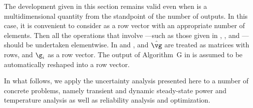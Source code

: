 \begin{remark} 
The development given in this section remains valid even when \g is a
multidimensional quantity from the standpoint of the number of outputs. In this
case, it is convenient to consider \g as a row vector with an appropriate number
of elements. Then all the operations that involve \g---such as those given in
, , and
---should be undertaken elementwise. In
 and , \vg and $\hat{\vg}$ are
treated as matrices with \nc rows, and $\g_i$ as a row vector. The output of
Algorithm~G in  is assumed to be automatically reshaped
into a row vector.
\end{remark}

In what follows, we apply the uncertainty analysis presented here to a number of
concrete problems, namely transient and dynamic steady-state power and
temperature analysis as well as reliability analysis and optimization.

